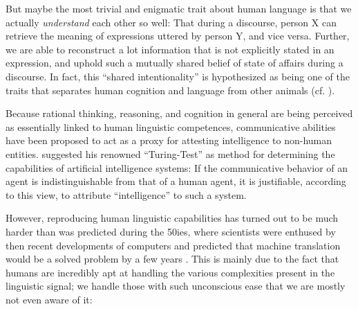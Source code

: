 But maybe the most trivial and enigmatic trait about human language
is that we actually \emph{understand} each other so well: That during
a discourse, person X can retrieve the meaning of expressions uttered
by person Y, and vice versa. Further, we are able to reconstruct a lot
information that is not explicitly stated in an expression, and uphold
such a mutually shared belief of state of affairs during a discourse.
In fact, this ``shared intentionality'' is hypothesized as being one
of the traits that separates human cognition and language from other
animals (cf. \cite{tomasello2007shared}).

Because {\color{red} rational} thinking, reasoning, and cognition in general are being perceived
as essentially linked to human linguistic competences, communicative abilities have been proposed
to act as a proxy for attesting intelligence to non-human entities. \cite{turing1950computing}
suggested his renowned ``Turing-Test'' as method for determining the capabilities of artificial
intelligence systems: If the communicative behavior of an agent is indistinguishable from that of
a human agent, it is justifiable, according to this view, to attribute ``intelligence'' to such a
system.

However, reproducing human linguistic capabilities has turned out to be much harder
than was predicted during the 50ies, where scientists were enthused by then recent
developments of computers and predicted that machine translation would be a solved
problem by a few years \citep{hutchins2005history}. This is mainly due to the fact
that humans are incredibly apt at handling the various complexities present in the
linguistic signal; we handle those with such unconscious ease that we are mostly
not even aware of it:

